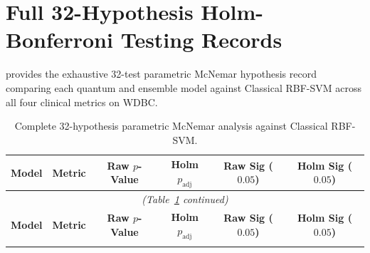 \appendix

\section{Full 32-Hypothesis Holm-Bonferroni Testing Records}
\label{app:full-holm-tables}

 provides the exhaustive 32-test parametric McNemar hypothesis record comparing each quantum and ensemble model against Classical RBF-SVM across all four clinical metrics on WDBC.

\begin{longtable}{llcccc}
\caption{Complete 32-hypothesis parametric McNemar analysis against Classical RBF-SVM.}\label{tab:full-parametric-holm}\\
\toprule
\textbf{Model} & \textbf{Metric} & \textbf{Raw $p$-Value} & \textbf{Holm $p_{\mathrm{adj}}$} & \textbf{Raw Sig ($0.05$)} & \textbf{Holm Sig ($0.05$)} \\
\midrule
\endfirsthead
\multicolumn{6}{c}{\small\itshape (Table~\ref{tab:full-parametric-holm} continued)}\\
\toprule
\textbf{Model} & \textbf{Metric} & \textbf{Raw $p$-Value} & \textbf{Holm $p_{\mathrm{adj}}$} & \textbf{Raw Sig ($0.05$)} & \textbf{Holm Sig ($0.05$)} \\
\midrule
\endhead
\bottomrule
\endlastfoot


\end{longtable}
